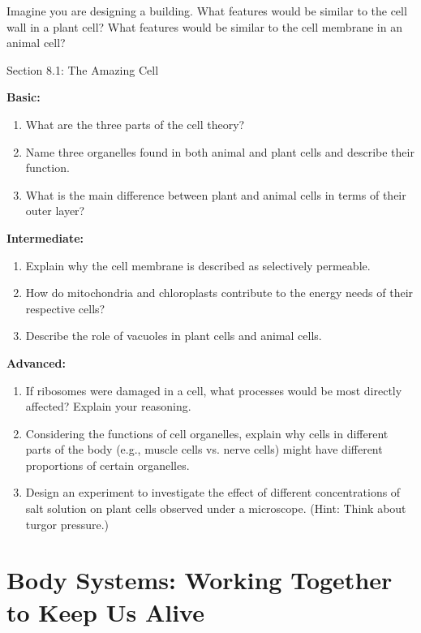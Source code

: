 \begin{stopandthink}
Imagine you are designing a building. What features would be similar to the cell wall in a plant cell?  What features would be similar to the cell membrane in an animal cell?
\end{stopandthink}


\begin{tieredquestions}{Section 8.1: The Amazing Cell}

\textbf{Basic:}
\begin{enumerate}
    \item What are the three parts of the cell theory?
    \item Name three organelles found in both animal and plant cells and describe their function.
    \item What is the main difference between plant and animal cells in terms of their outer layer?
\end{enumerate}

\textbf{Intermediate:}
\begin{enumerate}
    \item Explain why the cell membrane is described as selectively permeable.
    \item How do mitochondria and chloroplasts contribute to the energy needs of their respective cells?
    \item Describe the role of vacuoles in plant cells and animal cells.
\end{enumerate}

\textbf{Advanced:}
\begin{enumerate}
    \item  If ribosomes were damaged in a cell, what processes would be most directly affected? Explain your reasoning.
    \item  Considering the functions of cell organelles, explain why cells in different parts of the body (e.g., muscle cells vs. nerve cells) might have different proportions of certain organelles.
    \item  Design an experiment to investigate the effect of different concentrations of salt solution on plant cells observed under a microscope.  (Hint: Think about turgor pressure.)
\end{enumerate}
\end{tieredquestions}


\section{Body Systems: Working Together to Keep Us Alive}

